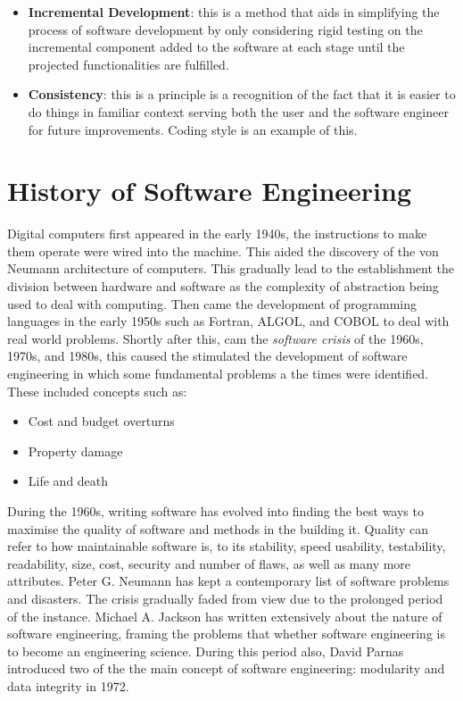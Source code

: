 \documentclass[a4paper]{article}
\begin{document}
{\begin{itemize}
    \item \textbf{Incremental Development}: this is a method that aids in simplifying the process of software development by only considering rigid testing on the incremental component added to the software at each stage until the projected functionalities are fulfilled.
    \item \textbf{Consistency}: this is a principle is a recognition of the fact that it is easier to do things in familiar context serving both the user and the software engineer for future improvements. Coding style is an example of this.\autocite{R02}
\end{itemize}

\section{History of Software Engineering}
Digital computers first appeared in the early 1940s, the instructions to make them operate were wired into the machine.\autocite{R03} This aided the discovery of the von Neumann architecture of computers. This gradually lead to the establishment the division between hardware and software as the complexity of abstraction being used to deal with computing. 
\bigbreak
Then came the development of programming languages in the early 1950s such as Fortran, ALGOL, and COBOL to deal with real world problems. Shortly after this, cam the \textit{software crisis} of the 1960s, 1970s, and 1980s, this caused the stimulated the development of software engineering in which some fundamental problems a the times were identified. These included concepts such as:
\begin{itemize}
    \item Cost and budget overturns
    \item Property damage
    \item Life and death\autocite{R04}
\end{itemize}
\bigbreak
During the 1960s, writing software has evolved into finding the best ways to maximise the quality of software and methods in the building it. Quality can refer to how maintainable software is, to its stability, speed usability, testability, readability, size, cost, security and number of flaws, as well as many more attributes.
\bigbreak
Peter G. Neumann has kept a contemporary list of software problems and disasters.\autocite{R05} The crisis gradually faded from view due to the prolonged period of the instance. Michael A. Jackson has written extensively about the nature of software engineering\autocite{R06}, framing the problems that whether software engineering is to become an engineering science. During this period also, David Parnas introduced two of the the main concept of software engineering: modularity and data integrity in 1972.
}
\end{document}
